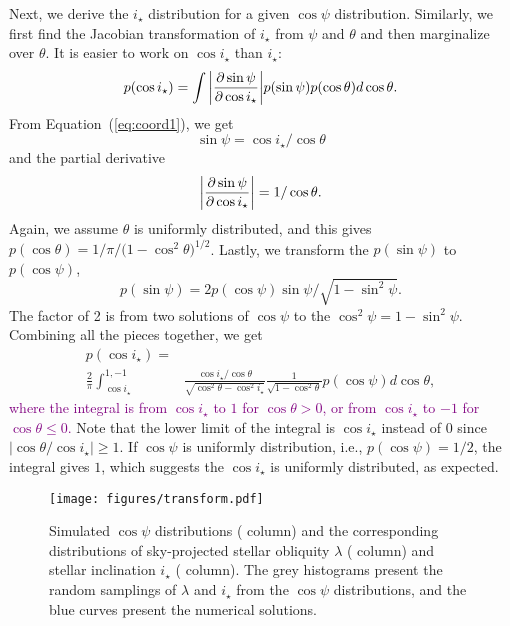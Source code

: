 \documentclass[twocolumn,times]{aastex631}
\newcommand{\edits}[1]{\textcolor{purple}{#1}}
\begin{document}
Next, we derive the $i_\star$ distribution for a given $\cos{\psi}$ distribution. Similarly, we first find the Jacobian transformation of $i_\star$ from $\psi$ and $\theta$ and then marginalize over $\theta$. It is easier to work on $\cos{i_\star}$ than $i_\star$:
\begin{equation}
    p(\cos{i_\star}) = \int \abs{\pdv{\sin{\psi}}{\cos{i_\star}}} p(\sin{\psi}) p(\cos{\theta}) d\cos{\theta}.
\end{equation}
From Equation~(\ref{eq:coord1}), we get 
\begin{equation}
    \sin{\psi} = \cos{i_\star}/\cos{\theta}
\end{equation} and the partial derivative
\begin{equation}
    \abs{\pdv{\sin{\psi}}{\cos{i_\star}}} = 1/\cos{\theta}.
\end{equation} 
Again, we assume $\theta$ is uniformly distributed, and this gives $p(\cos{\theta}) = 1/\pi/(1-\cos^2{\theta)^{1/2}}$. Lastly, we transform the $p(\sin{\psi})$ to $p(\cos{\psi})$,
\begin{equation}
    p(\sin{\psi}) = 2p(\cos{\psi})\sin{\psi}/\sqrt{1-\sin^2{\psi}}.
\end{equation}
The factor of 2 is from two solutions of $\cos{\psi}$ to the $\cos^2{\psi} = 1-\sin^2{\psi}$. Combining all the pieces together, we get
\begin{align}\label{eqn:jac_istar}
    p(\cos{i_\star}) = \nonumber\\ 
    \frac{2}{\pi} \int_{\cos{i_\star}}^{1,-1}& \frac{\cos{i_\star}/\cos{\theta}}{\sqrt{\cos^2{\theta}-\cos^2{i_\star}}}
    \frac{1}{\sqrt{1-\cos^2{\theta}}} p(\cos{\psi}) d\cos{\theta},
\end{align}
\edits{where the integral is from $\cos{i_\star}$ to $1$ for $\cos{\theta} > 0$, or from $\cos{i_\star}$ to $-1$ for $\cos{\theta} \leqslant 0$.}
Note that the lower limit of the integral is $\cos{i_\star}$ instead of 0 since $\lvert \cos{\theta}/\cos{i_\star} \rvert \geqslant 1$.
If $\cos{\psi}$ is uniformly distribution, i.e., $p(\cos{\psi}) = 1/2$, the integral gives $1$, which suggests the $\cos{i_\star}$ is uniformly distributed, as expected.

\begin{figure*}[ht!]
    \centering
    \texttt{[image: figures/transform.pdf]}
    \caption{Simulated $\cos{\psi}$ distributions ( column) and the corresponding distributions of sky-projected stellar obliquity $\lambda$ ( column) and stellar inclination $i_\star$ ( column). The grey histograms present the random samplings of $\lambda$ and $i_\star$ from the $\cos{\psi}$ distributions, and the blue curves present the numerical solutions.}
    \label{fig:transform}
\end{figure*}
\end{document}
